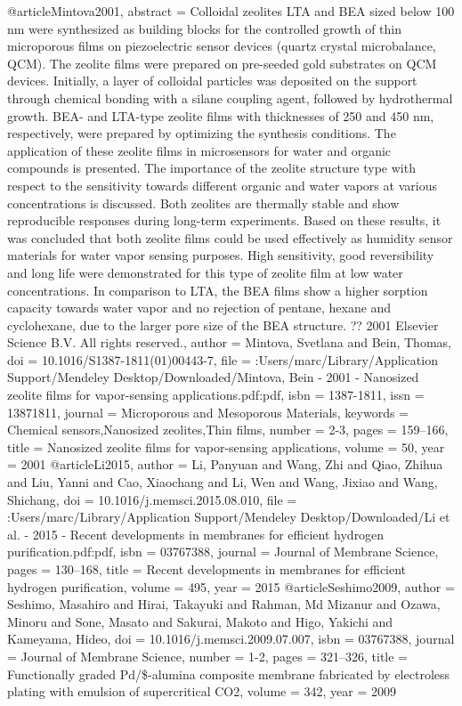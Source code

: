 @article{Mintova2001,
abstract = {Colloidal zeolites LTA and BEA sized below 100 nm were synthesized as building blocks for the controlled growth of thin microporous films on piezoelectric sensor devices (quartz crystal microbalance, QCM). The zeolite films were prepared on pre-seeded gold substrates on QCM devices. Initially, a layer of colloidal particles was deposited on the support through chemical bonding with a silane coupling agent, followed by hydrothermal growth. BEA- and LTA-type zeolite films with thicknesses of 250 and 450 nm, respectively, were prepared by optimizing the synthesis conditions. The application of these zeolite films in microsensors for water and organic compounds is presented. The importance of the zeolite structure type with respect to the sensitivity towards different organic and water vapors at various concentrations is discussed. Both zeolites are thermally stable and show reproducible responses during long-term experiments. Based on these results, it was concluded that both zeolite films could be used effectively as humidity sensor materials for water vapor sensing purposes. High sensitivity, good reversibility and long life were demonstrated for this type of zeolite film at low water concentrations. In comparison to LTA, the BEA films show a higher sorption capacity towards water vapor and no rejection of pentane, hexane and cyclohexane, due to the larger pore size of the BEA structure. ?? 2001 Elsevier Science B.V. All rights reserved.},
author = {Mintova, Svetlana and Bein, Thomas},
doi = {10.1016/S1387-1811(01)00443-7},
file = {:Users/marc/Library/Application Support/Mendeley Desktop/Downloaded/Mintova, Bein - 2001 - Nanosized zeolite films for vapor-sensing applications.pdf:pdf},
isbn = {1387-1811},
issn = {13871811},
journal = {Microporous and Mesoporous Materials},
keywords = {Chemical sensors,Nanosized zeolites,Thin films},
number = {2-3},
pages = {159--166},
title = {{Nanosized zeolite films for vapor-sensing applications}},
volume = {50},
year = {2001}
}
@article{Li2015,
author = {Li, Panyuan and Wang, Zhi and Qiao, Zhihua and Liu, Yanni and Cao, Xiaochang and Li, Wen and Wang, Jixiao and Wang, Shichang},
doi = {10.1016/j.memsci.2015.08.010},
file = {:Users/marc/Library/Application Support/Mendeley Desktop/Downloaded/Li et al. - 2015 - Recent developments in membranes for efficient hydrogen purification.pdf:pdf},
isbn = {03767388},
journal = {Journal of Membrane Science},
pages = {130--168},
title = {{Recent developments in membranes for efficient hydrogen purification}},
volume = {495},
year = {2015}
}
@article{Seshimo2009,
author = {Seshimo, Masahiro and Hirai, Takayuki and Rahman, Md Mizanur and Ozawa, Minoru and Sone, Masato and Sakurai, Makoto and Higo, Yakichi and Kameyama, Hideo},
doi = {10.1016/j.memsci.2009.07.007},
isbn = {03767388},
journal = {Journal of Membrane Science},
number = {1-2},
pages = {321--326},
title = {{Functionally graded Pd/{\$}\gamma{\$}-alumina composite membrane fabricated by electroless plating with emulsion of supercritical CO2}},
volume = {342},
year = {2009}
}
